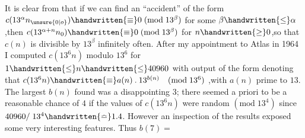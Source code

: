 It is clear from  that if we can find an ``accident'' of the form $c(13^{\alpha}n_{\unsure{0|o}})\handwritten{\equiv}0\;(\mathrm{mod}\;13^{\beta})$ for some $\beta\handwritten{\leq}\alpha$,then $c(13^{\alpha+n}n_{0})\handwritten{\equiv}0\;(\mathrm{mod}\;13^{\beta})$ for $n\handwritten{\geq}0$,so that \uline{$c(n)$} is divisible by $13^{\beta}$ infinitely often. After my appointment to Atlas in 1964 I computed \uline{$c(13^{6}n)$} modulo $13^{6}$ for $1\handwritten{\leq}n\handwritten{\leq}40960$ with output of the form
denoting that $c(13^{6}n)\handwritten{\equiv}a(n)\mathbin{.}13^{b(n)}\quad(\mathrm{mod}\;13^{6})$ ,with \uline{$a(n)$} prime to $13$. The largest $b(n)$ found was a disappointing $3$; there seemed a priori to be a reasonable chance of $4$ if the values of \uline{$c(13^{6}n)$} were random $(\mathrm{mod}\;13^{4})$ since $40960/\;13^{4}\handwritten{\bumpeq}1.4$. However an inspection of the results exposed some very interesting features. Thus $b(7)=$\ \parbox[c]{12mm}{}


